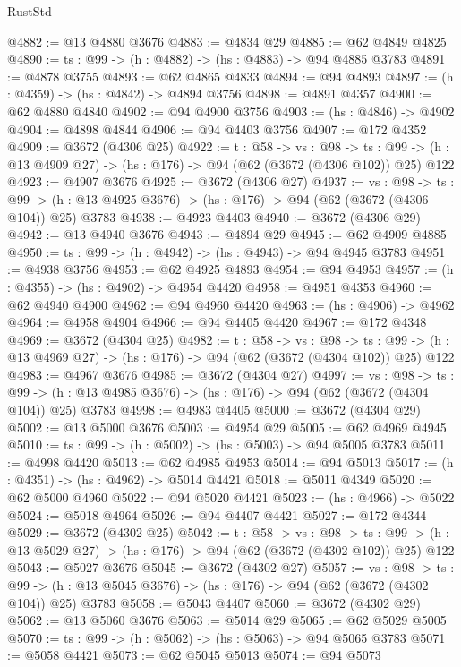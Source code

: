 \begin{lexlean}{RustStd}
\begin{coremodule}
{\begin{coremodule}
{{{{{{{{{@4882 := @13 @4880 @3676
@4883 := @4834 @29
@4885 := @62 @4849 @4825
@4890 := {ts : @99} -> (h : @4882) -> (hs : @4883) -> @94 @4885 @3783
@4891 := @4878 @3755
@4893 := @62 @4865 @4833
@4894 := @94 @4893
@4897 := (h : @4359) -> (hs : @4842) -> @4894 @3756
@4898 := @4891 @4357
@4900 := @62 @4880 @4840
@4902 := @94 @4900 @3756
@4903 := (hs : @4846) -> @4902
@4904 := @4898 @4844
@4906 := @94 @4403 @3756
@4907 := @172 @4352
@4909 := @3672 (@4306 @25)
@4922 := {t : @58} ->
  {vs : @98} ->
  {ts : @99} -> (h : @13 @4909 @27) -> (hs : @176) -> @94 (@62 (@3672 (@4306 @102)) @25) @122
@4923 := @4907 @3676
@4925 := @3672 (@4306 @27)
@4937 := {vs : @98} ->
  {ts : @99} -> (h : @13 @4925 @3676) -> (hs : @176) -> @94 (@62 (@3672 (@4306 @104)) @25) @3783
@4938 := @4923 @4403
@4940 := @3672 (@4306 @29)
@4942 := @13 @4940 @3676
@4943 := @4894 @29
@4945 := @62 @4909 @4885
@4950 := {ts : @99} -> (h : @4942) -> (hs : @4943) -> @94 @4945 @3783
@4951 := @4938 @3756
@4953 := @62 @4925 @4893
@4954 := @94 @4953
@4957 := (h : @4355) -> (hs : @4902) -> @4954 @4420
@4958 := @4951 @4353
@4960 := @62 @4940 @4900
@4962 := @94 @4960 @4420
@4963 := (hs : @4906) -> @4962
@4964 := @4958 @4904
@4966 := @94 @4405 @4420
@4967 := @172 @4348
@4969 := @3672 (@4304 @25)
@4982 := {t : @58} ->
  {vs : @98} ->
  {ts : @99} -> (h : @13 @4969 @27) -> (hs : @176) -> @94 (@62 (@3672 (@4304 @102)) @25) @122
@4983 := @4967 @3676
@4985 := @3672 (@4304 @27)
@4997 := {vs : @98} ->
  {ts : @99} -> (h : @13 @4985 @3676) -> (hs : @176) -> @94 (@62 (@3672 (@4304 @104)) @25) @3783
@4998 := @4983 @4405
@5000 := @3672 (@4304 @29)
@5002 := @13 @5000 @3676
@5003 := @4954 @29
@5005 := @62 @4969 @4945
@5010 := {ts : @99} -> (h : @5002) -> (hs : @5003) -> @94 @5005 @3783
@5011 := @4998 @4420
@5013 := @62 @4985 @4953
@5014 := @94 @5013
@5017 := (h : @4351) -> (hs : @4962) -> @5014 @4421
@5018 := @5011 @4349
@5020 := @62 @5000 @4960
@5022 := @94 @5020 @4421
@5023 := (hs : @4966) -> @5022
@5024 := @5018 @4964
@5026 := @94 @4407 @4421
@5027 := @172 @4344
@5029 := @3672 (@4302 @25)
@5042 := {t : @58} ->
  {vs : @98} ->
  {ts : @99} -> (h : @13 @5029 @27) -> (hs : @176) -> @94 (@62 (@3672 (@4302 @102)) @25) @122
@5043 := @5027 @3676
@5045 := @3672 (@4302 @27)
@5057 := {vs : @98} ->
  {ts : @99} -> (h : @13 @5045 @3676) -> (hs : @176) -> @94 (@62 (@3672 (@4302 @104)) @25) @3783
@5058 := @5043 @4407
@5060 := @3672 (@4302 @29)
@5062 := @13 @5060 @3676
@5063 := @5014 @29
@5065 := @62 @5029 @5005
@5070 := {ts : @99} -> (h : @5062) -> (hs : @5063) -> @94 @5065 @3783
@5071 := @5058 @4421
@5073 := @62 @5045 @5013
@5074 := @94 @5073
}}}}}}}}}
\end{coremodule}}
\end{coremodule}
\end{lexlean}
